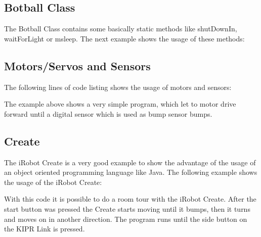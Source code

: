 \documentclass{juniorjournal}
\begin{document}
\subsection{Botball Class}
The Botball\cite{Botball} Class contains some basically static methods like shutDownIn, 
waitForLight or msleep.
The next example shows the usage of these methods:


\subsection{Motors/Servos and Sensors}
The following lines of code listing shows the usage of motors and sensors:

The example above shows a very simple program, which let to motor drive forward 
until a digital sensor which is used as bump sensor bumps.

\subsection{Create}
The iRobot Create\cite{create} is a very good example to show the advantage of the usage of 
an object oriented programming language like Java\cite{Java}.
The following example shows the usage of the iRobot Create\cite{create}:

With this code it is possible to do a room tour with the iRobot Create\cite{create}.
After the start button was pressed the Create\cite{create} starts moving until it bumps, then 
it turns and moves on in another direction. The program runs until the side 
button on the KIPR\cite{KIPR} Link\cite{link} is pressed.
\end{document}
